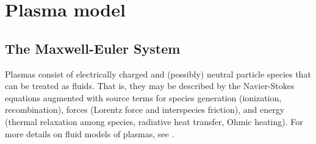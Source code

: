 \documentclass{article}
\begin{document}
\section{Plasma model} \label{sec:plasma-model}

\subsection{The Maxwell-Euler System}
Plasmas consist of electrically charged and (possibly) neutral particle species that can be treated as fluids. That is, they may be described by the Navier-Stokes equations augmented with source terms for species generation (ionization, recombination), forces (Lorentz force and interspecies friction), and energy (thermal relaxation among species, radiative heat transfer, Ohmic heating). For more details on fluid models of plasmas, see \cite{chen2016, remi_2014}.
\end{document}
